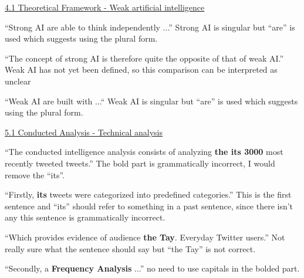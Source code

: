 \underline{4.1 Theoretical Framework - Weak artificial intelligence}

“Strong AI are able to think independently ...” Strong AI is singular but “are” is used which suggests using the plural form.

“The concept of strong AI is therefore quite the opposite of that of weak AI.”  Weak AI has not yet been defined, so this comparison can be interpreted as unclear

“Weak AI are built with ...“ Weak AI is singular but “are” is used which suggests using the plural form.

\underline{5.1 Conducted Analysis - Technical analysis}

“The conducted intelligence analysis consists of analyzing \textbf{the its 3000} most recently tweeted tweets.” The bold part is grammatically incorrect, I would remove the “its”.

“Firstly, \textbf{its} tweets were categorized into predefined categories.” This is the first sentence and “its” should refer to something in a past sentence, since there isn’t any this sentence is grammatically incorrect.

“Which provides evidence of audience \textbf{the Tay}. Everyday Twitter users.” Not really sure what the sentence should say but “the Tay” is not correct.

“Secondly, a \textbf{Frequency Analysis} ...” no need to use capitals in the bolded part.
